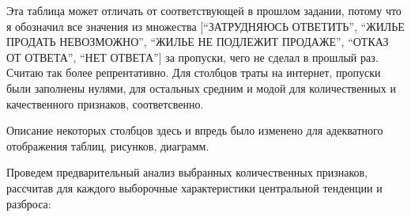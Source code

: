 \documentclass[12pt]{report}
\begin{document}
  Эта таблица может отличать от соответствующей в прошлом задании, потому что я обозначил все значения из множества $[$``ЗАТРУДНЯЮСЬ ОТВЕТИТЬ'', ``ЖИЛЬЕ ПРОДАТЬ НЕВОЗМОЖНО'', ``ЖИЛЬЕ НЕ ПОДЛЕЖИТ ПРОДАЖЕ'', ``ОТКАЗ ОТ ОТВЕТА'', ``НЕТ ОТВЕТА''$]$ за пропуски, чего не сделал в прошлый раз. Считаю так более репрентативно. Для столбцов траты на интернет, пропуски были заполнены нулями, для остальных средним и модой для количественных и качественного признаков, соответсвенно.
    \begin{note}{}
      Описание некоторых столбцов здесь и впредь было изменено для адекватного отображения таблиц, рисунков, диаграмм.
    \end{note}  
  \par
  Проведем предварительный анализ выбранных количественных признаков, рассчитав для каждого выборочные характеристики центральной тенденции и разброса:
    \par
\end{document}
